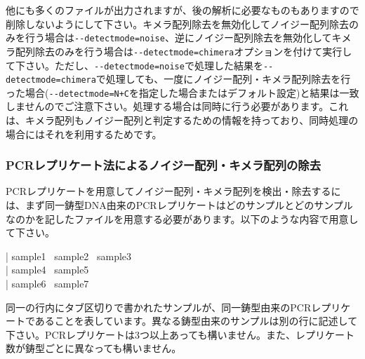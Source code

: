 \documentclass[titlepage,10pt,a4paper]{jsbook}
\newenvironment{content}{\begin{shaded}\vspace{-1em}\raggedright\ttfamily\footnotesize\setlength{\baselineskip}{1.4em}}{\end{shaded}\vspace{-1em}}
\begin{document}
他にも多くのファイルが出力されますが、後の解析に必要なものもありますので削除しないようにして下さい。キメラ配列除去を無効化してノイジー配列除去のみを行う場合は\texttt{{-}{-}detectmode=noise}、逆にノイジー配列除去を無効化してキメラ配列除去のみを行う場合は\texttt{{-}{-}detectmode=chimera}オプションを付けて実行して下さい。ただし、\texttt{{-}{-}detectmode=noise}で処理した結果を\texttt{{-}{-}detectmode=chimera}で処理しても、一度にノイジー配列・キメラ配列除去を行った場合(\texttt{{-}{-}detectmode=N+C}を指定した場合またはデフォルト設定)と結果は一致しませんのでご注意下さい。処理する場合は同時に行う必要があります。これは、キメラ配列もノイジー配列と判定するための情報を持っており、同時処理の場合にはそれを利用するためです。

\subsubsection{PCRレプリケート法によるノイジー配列・キメラ配列の除去}

PCRレプリケートを用意してノイジー配列・キメラ配列を検出・除去するには、まず同一鋳型DNA由来のPCRレプリケートはどのサンプルとどのサンプルなのかを記したファイルを用意する必要があります。以下のような内容で用意して下さい。
\begin{content}
| sample1~ sample2~ sample3\\
| sample4~ sample5\\
| sample6~ sample7
\end{content}
同一の行内にタブ区切りで書かれたサンプルが、同一鋳型由来のPCRレプリケートであることを表しています。異なる鋳型由来のサンプルは別の行に記述して下さい。PCRレプリケートは3つ以上あっても構いません。また、レプリケート数が鋳型ごとに異なっても構いません。
\end{document}
